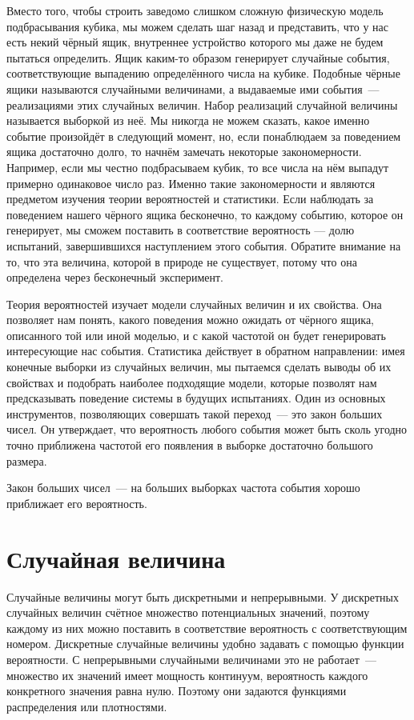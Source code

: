 Вместо того, чтобы строить заведомо слишком сложную физическую модель подбрасывания кубика, мы можем сделать шаг назад и представить, что у нас есть некий чёрный ящик, внутреннее устройство которого мы даже не будем пытаться определить. Ящик каким-то образом генерирует случайные события, соответствующие выпадению определённого числа на кубике. Подобные чёрные ящики называются случайными величинами, а выдаваемые ими события~--- реализациями этих случайных величин. Набор реализаций случайной величины называется выборкой из неё. Мы никогда не можем сказать, какое именно событие произойдёт в следующий момент, но, если понаблюдаем за поведением ящика достаточно долго, то начнём замечать некоторые закономерности. Например, если мы честно подбрасываем кубик, то все числа на нём выпадут примерно одинаковое число раз. Именно такие закономерности и являются предметом изучения теории вероятностей и статистики. Если наблюдать за поведением нашего чёрного ящика бесконечно, то каждому событию, которое он генерирует, мы сможем поставить в соответствие вероятность — долю испытаний, завершившихся наступлением этого события. Обратите внимание на то, что эта величина, которой в природе не существует, потому что она определена через бесконечный эксперимент. 

Теория вероятностей изучает модели случайных величин и их свойства. Она позволяет нам понять, какого поведения можно ожидать от чёрного ящика, описанного той или иной моделью, и с какой частотой он будет генерировать интересующие нас события. Статистика  действует в обратном направлении: имея конечные выборки из случайных величин, мы пытаемся сделать выводы об их свойствах и подобрать наиболее подходящие модели, которые позволят нам предсказывать поведение системы в будущих испытаниях. Один из основных инструментов, позволяющих совершать такой переход~--- это закон больших чисел. Он утверждает, что вероятность любого события может быть сколь угодно точно приближена частотой его появления в выборке достаточно большого размера. 

\begin{definition}
    Закон больших чисел~--- на больших выборках частота события хорошо приближает его вероятность.
\end{definition}

\section{Случайная величина}

Случайные величины могут быть дискретными и непрерывными. У дискретных случайных величин счётное множество потенциальных значений, поэтому каждому из них можно поставить в соответствие вероятность с соответствующим номером. Дискретные случайные величины удобно задавать с помощью функции вероятности. С непрерывными случайными величинами это не работает~--- множество их значений имеет мощность континуум, вероятность каждого конкретного значения равна нулю. Поэтому они задаются функциями распределения или плотностями.

